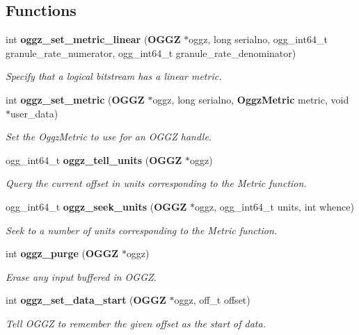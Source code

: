 \subsection*{Functions}
\begin{CompactItemize}
\item 
int {\bf oggz\_\-set\_\-metric\_\-linear} ({\bf OGGZ} $\ast$oggz, long serialno, ogg\_\-int64\_\-t granule\_\-rate\_\-numerator, ogg\_\-int64\_\-t granule\_\-rate\_\-denominator)
\begin{CompactList}\small\item\em Specify that a logical bitstream has a linear metric. \item\end{CompactList}\item 
int {\bf oggz\_\-set\_\-metric} ({\bf OGGZ} $\ast$oggz, long serialno, {\bf Oggz\-Metric} metric, void $\ast$user\_\-data)
\begin{CompactList}\small\item\em Set the Oggz\-Metric to use for an OGGZ handle. \item\end{CompactList}\item 
ogg\_\-int64\_\-t {\bf oggz\_\-tell\_\-units} ({\bf OGGZ} $\ast$oggz)
\begin{CompactList}\small\item\em Query the current offset in units corresponding to the Metric function. \item\end{CompactList}\item 
ogg\_\-int64\_\-t {\bf oggz\_\-seek\_\-units} ({\bf OGGZ} $\ast$oggz, ogg\_\-int64\_\-t units, int whence)
\begin{CompactList}\small\item\em Seek to a number of units corresponding to the Metric function. \item\end{CompactList}\item 
int {\bf oggz\_\-purge} ({\bf OGGZ} $\ast$oggz)
\begin{CompactList}\small\item\em Erase any input buffered in OGGZ. \item\end{CompactList}\item 
int {\bf oggz\_\-set\_\-data\_\-start} ({\bf OGGZ} $\ast$oggz, off\_\-t offset)
\begin{CompactList}\small\item\em Tell OGGZ to remember the given offset as the start of data. \item\end{CompactList}\item 

\end{CompactItemize}
